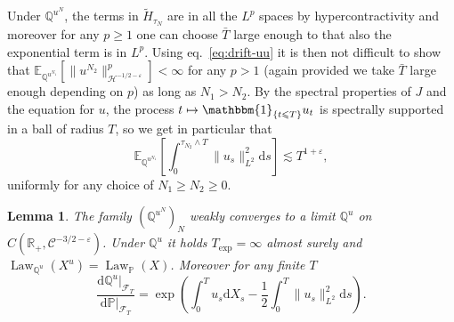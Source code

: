 \documentclass[11pt]{article}
\newcommand{\mathd}{\mathrm{d}}
\newcommand{\tmop}[1]{\ensuremath{\operatorname{#1}}}
\newtheorem{lemma}{Lemma}
\newcommand{\VV}{\mathscr{C}}
\newcommand{\CF}{\mathscr{F}}
\begin{document}
Under $\mathbb{Q}^{u^N}$, the terms in $\tilde{H}_{\tau_N}$ are in all the
$L^p$ spaces by hypercontractivity and moreover for any $p \geqslant 1$ one
can choose $\bar{T}$ large enough to that also the exponential term is in
$L^p$. Using eq.~{\eqref{eq:drift-uu}} it is then not difficult to show that
$\mathbb{E}_{\mathbb{Q}^{u^{N_1}}} [\| u^{N_2} \|^p_{\mathcal{H}^{- 1 / 2 -
\varepsilon}}] < \infty$ for any $p > 1$ (again provided we take $\bar{T}$
large enough depending on $p$) as long as $N_1 > N_2$. By the spectral
properties of $J$ and the equation for $u$, the process $t \mapsto
\mathbbm{1}_{\{ t \leqslant T \}} u_t$ is spectrally supported in a ball of
radius $T$, so we get in particular that
\[ \mathbb{E}_{\mathbb{Q}^{u^{N_1}}} \left[ \int^{\tau_{N_2} \wedge T}_0 \|
   u_s \|^2_{L^2} \mathd s \right] \lesssim T^{1 + \varepsilon}, \]
uniformly for any choice of $N_1 \geqslant N_2 \geqslant 0$.

\begin{lemma}
  \label{Lemma:changeofvariables}The family $(\mathbb{Q}^{u^N})_N$ weakly
  converges to a limit $\mathbb{Q}^u$ on $C \left( \mathbb{R}_+, \VV^{- 3 / 2
  - \varepsilon} \right)$. Under $\mathbb{Q}^u$ it holds $T_{\exp} = \infty$
  almost surely and $\tmop{Law}_{\mathbb{Q}^u} (X^u) = \tmop{Law}_{\mathbb{P}}
  (X)$. Moreover for any finite $T$
  \[ \frac{\mathd \mathbb{Q}^u |_{\CF_T}}{\mathd \mathbb{P}|_{\CF_T}} = \exp
     \left( \int^T_0 u_s \mathd X_s - \frac{1}{2} \int^T_0 \| u_s \|^2_{L^2}
     \mathd s \right) . \]
\end{lemma}
\end{document}
